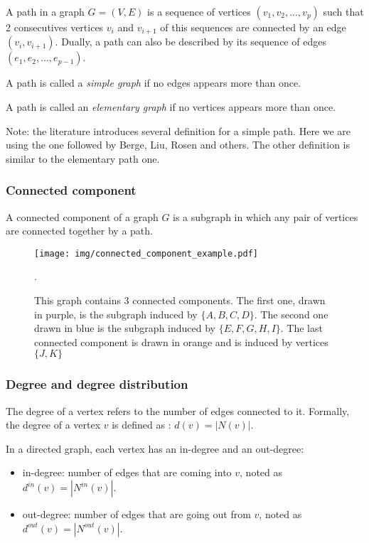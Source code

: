 \documentclass[table]{report}
\begin{document}
A path in a graph $G = (V,E)$ is a sequence of vertices $(v_1, v_2,..., v_p)$ such that 2 consecutives vertices $v_i$ and $v_{i+1}$ of this sequences are connected by an edge $(v_i, v_{i+1})$. Dually, a path can also be described by its sequence of edges $(e_1, e_2,...,e_{p-1})$.

A path is called a \textit{simple graph} if no edges appears more than once. 

A path is called an \textit{elementary graph} if no vertices appears more than once. 

Note: the literature introduces several definition for a simple path. Here we are using the one followed by Berge, Liu, Rosen and others. The other definition is similar to the elementary path one.


\subsubsection{Connected component}

A connected component of a graph $G$ is a subgraph in which any pair of vertices are connected together by a path.

\begin{figure}[h]%
\centering
\texttt{[image: img/connected\_component\_example.pdf]}
\caption{This graph contains 3 connected components. The first one, drawn in purple, is the subgraph induced by $\{A,B,C,D\}$. The second one drawn in blue is the subgraph induced by $\{E,F,G,H,I\}$. The last connected component is drawn in orange and is induced by vertices $\{J,K\}$}.

\label{fig:directed_weighted_examples}
\end{figure}


\subsubsection{Degree and degree distribution}

The degree of a vertex refers to the number of edges connected to it. Formally, the degree of a vertex $v$ is defined as : $d(v) = |N(v)|$.

In a directed graph, each vertex has an in-degree and an out-degree:
\begin{itemize}[noitemsep]
    \item in-degree: number of edges that are coming into $v$, noted as $d^{in}(v) = |N^{in}(v)|$.

    \item out-degree: number of edges that are going out from $v$, noted as $d^{out}(v) = |N^{out}(v)|$. 
\end{itemize}
\end{document}
